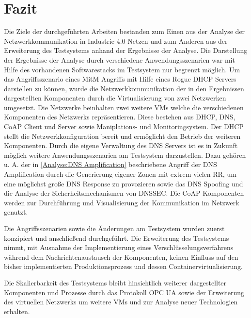 \chapter{Fazit}
Die Ziele der durchgeführten Arbeiten bestanden zum Einen aus der Analyse der Netzwerkkommunikation in Industrie 4.0 Netzen und zum Anderen aus der Erweiterung des Testsystems anhand der Ergebnisse der Analyse. Die Darstellung der Ergebnisse der Analyse durch verschiedene Anwendungsszenarien war mit Hilfe des vorhandenen Softwarestacks im Testsystem nur  begrenzt möglich. Um das Angriffsszenario eines \ac{MitM} Angriffs mit Hilfe eines Rogue \ac{DHCP} Servers darstellen zu können, wurde die Netzwerkkommunikation der in den Ergebnissen dargestellten Komponenten durch die Virtualisierung von zwei Netzwerken umgesetzt. Die Netzwerke beinhalten zwei weitere \ac{VM}s welche die verschiedenen Komponenten des Netzwerks repräsentieren. Diese bestehen aus \ac{DHCP}, \ac{DNS}, \ac{CoAP} Client und Server sowie Maniplations- und Monitoringsystem. Der \ac{DHCP} stellt die Netzwerkkonfiguration bereit und ermöglicht den Betrieb der weiteren Komponenten. Durch die eigene Verwaltung des \ac{DNS} Servers ist es in Zukunft möglich weitere Anwendungsszenarien am Testsystem darzustellen. Dazu gehören u. A. der in \autoref{Analyse:DNS Amplification} beschriebene Angriff der \ac{DNS} Amplification durch die Generierung eigener Zonen mit extrem vielen \ac{RR}, um eine möglichst große \ac{DNS} Response zu provozieren sowie das \ac{DNS} Spoofing und die Analyse der Sicherheitsmechanismen von \ac{DNSSEC}. Die \ac{CoAP} Komponenten werden zur Durchführung und Visualisierung der Kommunikation im Netzwerk genutzt.

Die Angriffsszenarien sowie die Änderungen am Testsystem wurden zuerst konzipiert und anschließend durchgeführt. Die Erweiterung des Testsystems nimmt, mit Ausnahme der Implementierung eines Verschlüsselungsverfahrens während dem Nachrichtenaustausch der Komponenten, keinen Einfluss auf den bisher implementierten Produktionsprozess und dessen Containervirtualisierung. 

Die Skalierbarkeit des Testsystems bleibt hinsichtlich weiterer dargestellter Komponenten und Prozesse durch das Protokoll \ac{OPC UA} sowie der Erweiterung des virtuellen Netzwerks um weitere \ac{VM}s und zur Analyse neuer Technologien erhalten. 

